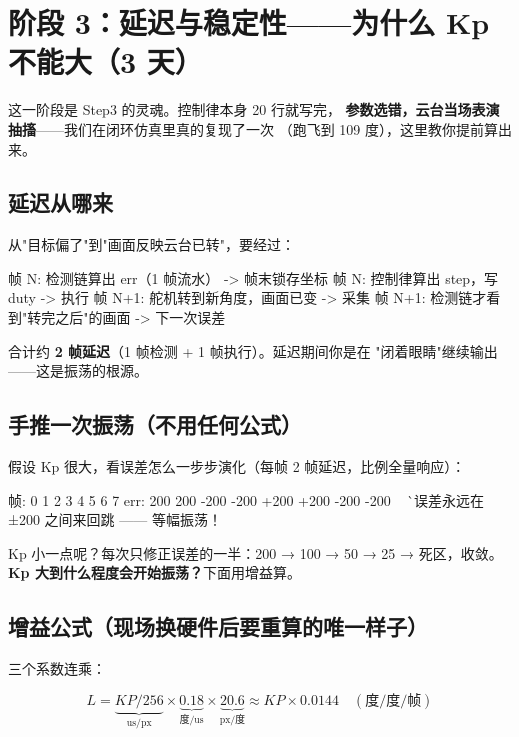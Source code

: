 \documentclass[11pt]{ctexart}
\begin{document}
\section{阶段 3：延迟与稳定性——为什么 Kp 不能大（3 天）}

这一阶段是 Step3 的灵魂。控制律本身 20 行就写完，
\textbf{参数选错，云台当场表演抽搐}——我们在闭环仿真里真的复现了一次
（跑飞到 109 度），这里教你提前算出来。

\subsection{延迟从哪来}

从"目标偏了"到"画面反映云台已转"，要经过：

\begin{Verilog}
帧 N:   检测链算出 err（1 帧流水）           -> 帧末锁存坐标
帧 N:   控制律算出 step，写 duty              -> 执行
帧 N+1: 舵机转到新角度，画面已变              -> 采集
帧 N+1: 检测链才看到"转完之后"的画面          -> 下一次误差
\end{Verilog}

合计约 \textbf{2 帧延迟}（1 帧检测 + 1 帧执行）。延迟期间你是在
"闭着眼睛"继续输出——这是振荡的根源。

\subsection{手推一次振荡（不用任何公式）}

假设 Kp 很大，看误差怎么一步步演化（每帧 2 帧延迟，比例全量响应）：

\begin{Verilog}
帧:   0     1     2     3     4     5     6     7
err:  200   200   -200  -200  +200  +200  -200  -200
      ^^^^^^^^^^^ 误差永远在 ±200 之间来回跳 —— 等幅振荡！
\end{Verilog}

Kp 小一点呢？每次只修正误差的一半：200 → 100 → 50 → 25 → 死区，收敛。
\textbf{Kp 大到什么程度会开始振荡？}下面用增益算。

\subsection{增益公式（现场换硬件后要重算的唯一样子）}

三个系数连乘：

$$L = \underbrace{KP/256}_{\text{us/px}} \times \underbrace{0.18}_{\text{度/us}} \times \underbrace{20.6}_{\text{px/度}} \approx KP \times 0.0144 \quad (\text{度/度/帧})$$
\end{document}
